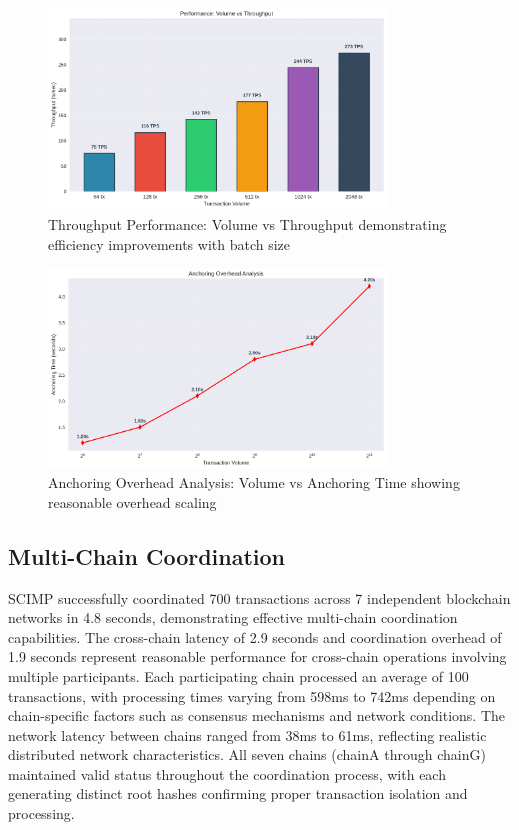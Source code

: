 \begin{figure}[h]
\centering
\includegraphics[width=0.8\textwidth]{Images/throughput_analysis.png}
\caption{Throughput Performance: Volume vs Throughput demonstrating efficiency improvements with batch size}
\label{fig:throughput-analysis}
\end{figure}

\begin{figure}[h]
\centering
\includegraphics[width=0.8\textwidth]{Images/anchoring_analysis.png}
\caption{Anchoring Overhead Analysis: Volume vs Anchoring Time showing reasonable overhead scaling}
\label{fig:anchoring-analysis}
\end{figure}

\subsection{Multi-Chain Coordination}

SCIMP successfully coordinated 700 transactions across 7 independent blockchain networks in 4.8 seconds, demonstrating effective multi-chain coordination capabilities. The cross-chain latency of 2.9 seconds and coordination overhead of 1.9 seconds represent reasonable performance for cross-chain operations involving multiple participants. Each participating chain processed an average of 100 transactions, with processing times varying from 598ms to 742ms depending on chain-specific factors such as consensus mechanisms and network conditions. The network latency between chains ranged from 38ms to 61ms, reflecting realistic distributed network characteristics. All seven chains (chainA through chainG) maintained valid status throughout the coordination process, with each generating distinct root hashes confirming proper transaction isolation and processing.

